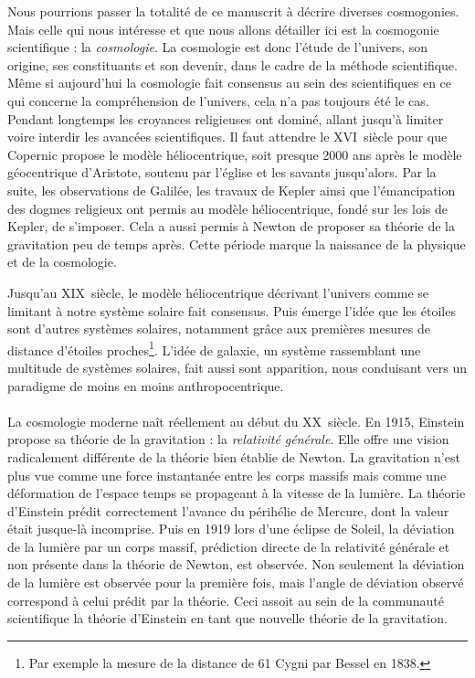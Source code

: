 \documentclass[11pt, twoside, a4paper, openright]{report}
\begin{document}
Nous pourrions passer la totalité de ce manuscrit à décrire diverses cosmogonies. Mais celle qui nous intéresse et que nous allons détailler ici est la cosmogonie scientifique : la \emph{cosmologie}. La cosmologie est donc l'étude de l'univers, son origine, ses constituants et son devenir, dans le cadre de la méthode scientifique. Même si aujourd'hui la cosmologie fait consensus au sein des scientifiques en ce qui concerne la compréhension de l'univers, cela n'a pas toujours été le cas. Pendant longtemps les croyances religieuses ont dominé, allant jusqu'à limiter voire interdir les avancées scientifiques.
Il faut attendre le \textsc{XVI}\ieme~siècle pour que Copernic propose le modèle héliocentrique, soit presque \num{2000} ans après le modèle géocentrique d'Aristote, soutenu par l'église et les savants jusqu'alors.
Par la suite, les observations de Galilée, les travaux de Kepler ainsi que l'émancipation des dogmes religieux ont permis au modèle héliocentrique, fondé sur les lois de Kepler, de s'imposer. Cela a aussi permis à Newton de proposer sa théorie de la gravitation peu de temps après. Cette période marque la naissance de la physique et de la cosmologie.

Jusqu'au \textsc{XIX}\ieme~siècle, le modèle héliocentrique décrivant l'univers comme se limitant à notre système solaire fait consensus. Puis émerge l'idée que les étoiles sont d'autres systèmes solaires, notamment grâce aux premières mesures de distance d'étoiles proches\footnote{Par exemple la mesure de la distance de 61 Cygni par Bessel en 1838.}. L'idée de galaxie, un système rassemblant une multitude de systèmes solaires, fait aussi sont apparition, nous conduisant vers un paradigme de moins en moins anthropocentrique.

\paragraph{}
La cosmologie moderne naît réellement au début du \textsc{XX}\ieme~siècle. En 1915, Einstein propose sa théorie de la gravitation : la \emph{relativité générale}. Elle offre une vision radicalement différente de la théorie bien établie de Newton. La gravitation n'est plus vue comme une force instantanée entre les corps massifs mais comme une déformation de l'espace temps se propageant à la vitesse de la lumière. La théorie d'Einstein prédit correctement l'avance du périhélie de Mercure, dont la valeur était jusque-là incomprise. Puis en 1919 lors d'une éclipse de Soleil, la déviation de la lumière par un corps massif, prédiction directe de la relativité générale et non présente dans la théorie de Newton, est observée. Non seulement la déviation de la lumière est observée pour la première fois, mais l'angle de déviation observé correspond à celui prédit par la théorie. Ceci assoit au sein de la communauté scientifique la théorie d'Einstein en tant que nouvelle théorie de la gravitation.
\end{document}
